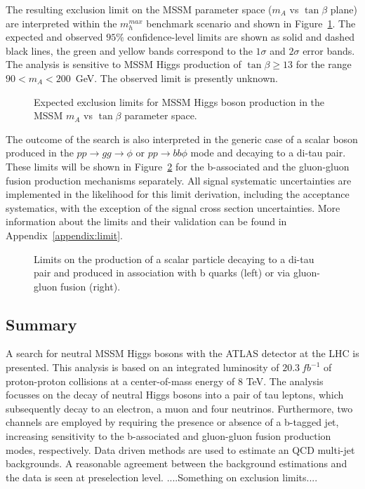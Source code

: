 The resulting exclusion limit on the MSSM parameter space ($m_A$ vs $\tan\beta$ plane) are interpreted 
within the $m_{h}^{max}$ benchmark scenario \cite{MSSMmhmax} and  shown in 
%
Figure~\ref{fig:limit_extract_combined}. %
%
The expected and observed $95\%$ confidence-level limits are shown as solid and dashed black lines, the green 
and yellow bands correspond to the $1\sigma$ and $2\sigma$ error bands. 
The analysis is sensitive to MSSM Higgs production of $\tan\beta \geq 13$ for the range $90<m_A<200$~GeV.
The observed limit is presently unknown. %


\begin{figure}[t]
  \centering
  \caption{Expected %
  exclusion limits for MSSM Higgs boson production 
in the MSSM $m_A$ vs $\tan\beta$ parameter space.}
\label{fig:limit_extract_combined}
\end{figure}


The outcome of the search is also interpreted in the generic case of a scalar boson produced in the
$pp \rightarrow gg \rightarrow \phi$ or $pp \rightarrow bb\phi$ mode and decaying to a di-tau pair.
These limits will be shown in Figure~\ref{fig:limit_xs} 
for the b-associated  and the gluon-gluon fusion production mechanisms separately.
All signal systematic uncertainties are implemented in the likelihood
for this limit derivation, including the  acceptance systematics, with the exception of the signal cross section
uncertainties.
More information about the limits and their validation can be found in Appendix~\ref{appendix:limit}.

\begin{figure}[]
  \centering
  \caption{ Limits on the production of a scalar particle decaying to a di-tau pair
    and produced     in association with b quarks (left) or   via gluon-gluon fusion (right).}
\label{fig:limit_xs}
\end{figure}

\subsection{Summary}
A search for neutral MSSM Higgs bosons with the ATLAS detector at the
LHC is presented.  This analysis is based on an integrated luminosity of $20.3 ~fb^{-1}$
of proton-proton collisions at a center-of-mass energy of 8 TeV. The
analysis focusses on the decay of neutral Higgs bosons into a pair of tau
leptons, which subsequently decay to an electron, a muon and four
neutrinos. Furthermore, two channels are employed by requiring the
presence or absence of a b-tagged jet, increasing sensitivity to
the b-associated and gluon-gluon fusion production modes,
respectively. Data driven methods are used to estimate \Ztautau an QCD multi-jet
 backgrounds. A reasonable agreement between the background
estimations and the data is seen at preselection level. 
....Something on exclusion limits....
